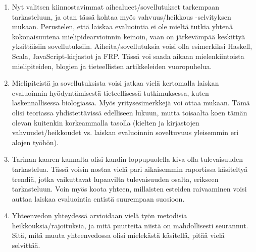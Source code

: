 \documentclass[12pt,a4paper,finnish,oneside]{article}
\begin{document}
\begin{enumerate}
  \item \begin{sloppypar} Nyt valitsen kiinnostavimmat aihealueet/sovellutukset tarkempaan tarkasteluun, ja otan tässä kohtaa myös vahvuus/heikkous -selvityksen mukaan. Perustelen, että laiskaa evaluointia ei ole mieltä tutkia yhtenä kokonaisuutena mielipidearvioinnin keinoin, vaan on järkevämpää keskittyä yksittäisiin sovellutuksiin. Aiheita/sovellutuksia voisi olla esimerkiksi Haskell, Scala, JavaScript-kirjastot ja FRP. Tässä voi saada aikaan mielenkiintoista mielipiteiden, blogien ja tieteellisten artikkeleiden vuoropuhelua. \end{sloppypar}

  \item Mielipiteistä ja sovellutuksista voisi jatkaa vielä kertomalla laiskan evaluoinnin hyödyntämisestä tieteellisessä tutkimuksessa, kuten laskennallisessa biologiassa. Myös yritysesimerkkejä voi ottaa mukaan. Tämä olisi teoriassa yhdistettävissä edelliseen lukuun, mutta toisaalta koen tämän olevan kuitenkin korkeammalla tasolla (kielten ja kirjastojen vahvuudet/heikkoudet vs. laiskan evaluoinnin soveltuvuus yleisemmin eri alojen työhön).

  \item Tarinan kaaren kannalta olisi kandin loppupuolella kiva olla tulevaisuuden tarkastelua. Tässä voisin nostaa vielä pari aikaisemmin raportissa käsiteltyä trendiä, jotka vaikuttavat lupaavilta tulevaisuuden osalta, erikseen tarkasteluun. Voin myös koota yhteen, millaisten esteiden raivaaminen voisi auttaa laiskaa evaluointia entistä suurempaan suosioon.

  \item Yhteenvedon yhteydessä arvioidaan vielä työn metodisia heikkouksia/rajoituksia, ja mitä puutteita niistä on mahdollisesti seurannut. Sitä, mitä muuta yhteenvedossa olisi mielekästä käsitellä, pitää vielä selvittää.
\end{enumerate}

%


% 

\renewcommand{\refname}{Lähteet}  %



\end{document}

